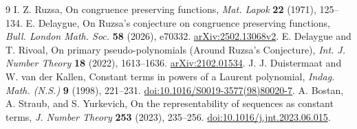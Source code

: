 \documentclass[11pt,a4paper]{article}
\theoremstyle{remark}\newtheorem{remark}[theorem]{Remark}
\begin{document}
\begin{thebibliography}{9}
 I. Z. Ruzsa, On congruence preserving functions,
\emph{Mat. Lapok} \textbf{22} (1971), 125--134.
 E. Delaygue, On Ruzsa's conjecture on congruence preserving
functions, \emph{Bull. London Math. Soc.} \textbf{58} (2026), e70332.
\href{https://arxiv.org/abs/2502.13068}{arXiv:2502.13068v2}.
 E. Delaygue and T. Rivoal, On primary pseudo-polynomials
(Around Ruzsa's Conjecture), \emph{Int. J. Number Theory} \textbf{18} (2022),
1613--1636. \href{https://arxiv.org/abs/2102.01534}{arXiv:2102.01534}.
 J. J. Duistermaat and W. van der Kallen,
Constant terms in powers of a Laurent polynomial,
\emph{Indag. Math. (N.S.)} \textbf{9} (1998), 221--231.
\href{https://doi.org/10.1016/S0019-3577(98)80020-7}{doi:10.1016/S0019-3577(98)80020-7}.
 A. Bostan, A. Straub, and S. Yurkevich,
On the representability of sequences as constant terms,
\emph{J. Number Theory} \textbf{253} (2023), 235--256.
\href{https://doi.org/10.1016/j.jnt.2023.06.015}{doi:10.1016/j.jnt.2023.06.015}.
\end{thebibliography}
\end{document}
